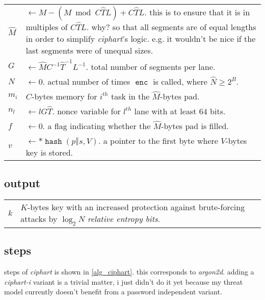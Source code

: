 \documentclass[twocolumn]{article}
\DeclareMathOperator{\enc}{\texttt{enc}}
\DeclareMathOperator{\hash}{\texttt{hash}}
\begin{document}
\begin{tabularx}{\columnwidth}{lX}
    $\hat M$    & $\gets M - (M \bmod C\hat TL) + C\hat TL$.  this is to
                    ensure that it is in multiples of $C\hat TL$.  why?  so
                    that all segments are of equal lengths in order to
                    simplify \emph{ciphart}'s logic.  e.g. it wouldn't be
                    nice if the last segments were of unequal sizes.\\
    $G$         & $\gets \hat MC^{-1}\hat T^{-1}L^{-1}$.  total number of
                    segments per lane.\\
    $N$    & $\gets 0$.  actual number of times $\enc$ is called,
                    where $\hat N \ge 2^B$.\\
    $m_i$       & $C$-bytes memory for $i^{th}$ task in the $\hat M$-bytes
                    pad.\\
    $n_l$       & $\gets lG\hat T$.  nonce variable for $l^{th}$ lane with
                    at least $64$ bits.\\
    $f$         & $\gets 0$.  a flag indicating whether the $\hat M$-bytes
                    pad is filled.\\
    $v$         & $\gets *\hash(p \mathbin\Vert s, V)$.  a pointer to the
                    first byte where $V$-bytes key is stored.\\
\end{tabularx}

\subsection{output}
\begin{tabularx}{\columnwidth}{lX}
$k$ & $K$-bytes key with an increased protection against brute-forcing
attacks by $\log_2 N$ \emph{relative entropy bits}.\\
\end{tabularx}

\subsection{steps}
steps of \emph{ciphart} is shown in \cref{alg_ciphart}.  this corresponds
to \emph{argon2d}.  adding a \emph{ciphart-i} variant is a trivial matter,
i just didn't do it yet because my threat model currently doesn't benefit
from a password independent variant.
\end{document}
